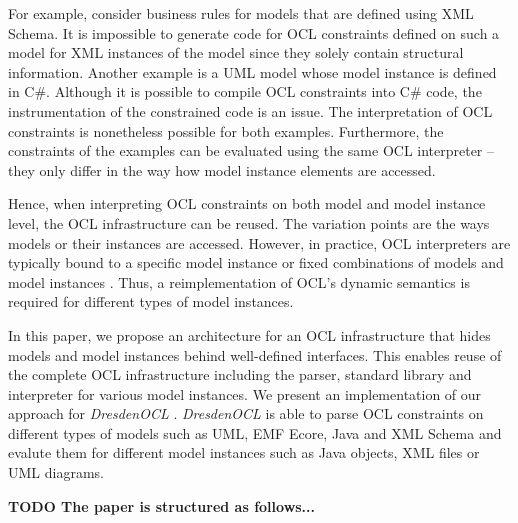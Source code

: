 	For example, consider business rules for models that are defined using XML Schema. 
	It is impossible to generate code for OCL constraints defined on such 
	a model for XML instances of the model since they solely contain structural information. 
	Another example is a UML model whose model
	instance is defined in C\#. Although it is possible to compile OCL constraints into 
	C\# code, the instrumentation of the constrained code is an issue. The interpretation 
	of OCL constraints is nonetheless possible for both examples. Furthermore, the 
	constraints of the examples can be evaluated using the same OCL interpreter -- 
	they only differ in the way how model instance elements are accessed.

	Hence, when interpreting OCL constraints on both model and model 
	instance level, the OCL infrastructure can be reused. The variation points are the 
	ways models or their instances are accessed. However, in practice, OCL 
	interpreters are typically bound 
	to a specific model instance or fixed combinations of models and model instances 
	. Thus, a reimplementation of OCL's dynamic semantics 
	is required for different types of model instances.

	In this paper, we propose an architecture for an OCL
	infrastructure that hides models and model instances behind well-defined interfaces.
	This enables reuse of the complete OCL infrastructure including the parser, 
	standard library and interpreter for various model instances. We present an
	implementation of our approach for \textit{DresdenOCL}
	\cite{WWW:dresdenOCL}. \textit{DresdenOCL} is able to parse OCL
	constraints on different types of models such as UML, EMF Ecore, Java and 
	XML Schema and evalute them for different model instances such as Java 
	objects, XML files or {UML diagrams}.
	
	\textbf{TODO The paper is structured as follows...}